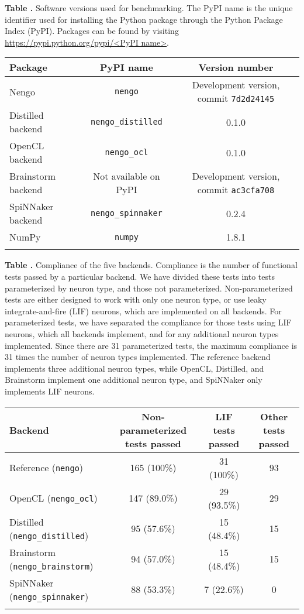 \documentclass{frontiersSCNS}
\begin{document}
\begin{table}[!ht]
\textbf{\label{Tab:01} Table .}{
  Software versions used for benchmarking.
  The PyPI name is the unique identifier used for installing the Python package
  through the Python Package Index (PyPI). Packages can be found by
  visiting \url{https://pypi.python.org/pypi/<PyPI name>}.}

\processtable{ }
{\begin{tabular}{lcc}\toprule
 Package & PyPI name & Version number\\\midrule
 Nengo & \texttt{nengo} & Development version, commit \texttt{7d2d24145} \\
 Distilled backend & \texttt{nengo\_distilled} & 0.1.0 \\
 OpenCL backend & \texttt{nengo\_ocl} & 0.1.0 \\
 Brainstorm backend & Not available on PyPI & Development version, commit \texttt{ac3cfa708} \\
 SpiNNaker backend & \texttt{nengo\_spinnaker} & 0.2.4 \\
 NumPy & \texttt{numpy} & 1.8.1 \\\botrule
\end{tabular}}{}
\end{table}

\begin{table}[!ht]
\textbf{\label{Tab:02} Table .}{
  Compliance of the five backends. Compliance is the number of functional
  tests passed by a particular backend. We have divided these tests into
  tests parameterized by neuron type, and those not parameterized.
  Non-parameterized tests are either designed to work with only
  one neuron type, or use leaky integrate-and-fire (LIF) neurons,
  which are implemented on all backends. For parameterized tests,
  we have separated the compliance for those tests using LIF neurons,
  which all backends implement, and for any additional neuron types
  implemented. Since there are 31 parameterized tests, the maximum
  compliance is 31 times the number of neuron types implemented.
  The reference backend implements three additional neuron types,
  while OpenCL, Distilled, and Brainstorm implement one additional neuron type,
  and SpiNNaker only implements LIF neurons.}

\processtable{ }
{\begin{tabular}{lccc}\toprule
 Backend & Non-parameterized tests passed & LIF tests passed & Other tests passed \\ \midrule
 Reference (\texttt{nengo}) & 165 (100\%) & 31 (100\%) & 93 \\
 OpenCL (\texttt{nengo\_ocl}) & 147 (89.0\%) & 29 (93.5\%) & 29 \\
 Distilled (\texttt{nengo\_distilled}) & 95 (57.6\%) & 15 (48.4\%) & 15 \\
 Brainstorm (\texttt{nengo\_brainstorm}) & 94 (57.0\%) & 15 (48.4\%) & 15 \\
 SpiNNaker (\texttt{nengo\_spinnaker}) & 88 (53.3\%) & 7 (22.6\%) & 0 \\\botrule
\end{tabular}}{}
\end{table}
\end{document}
